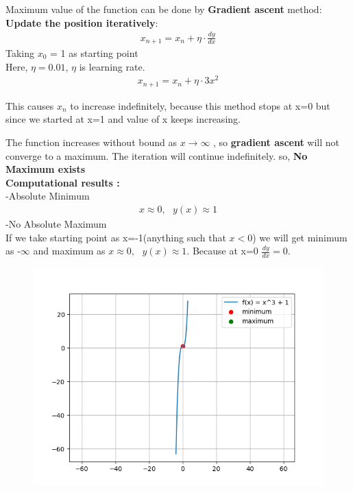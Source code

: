 \documentclass[journal]{IEEEtran}
\begin{document}
Maximum value of the function can be done by \textbf{Gradient ascent} method:\\
\textbf{Update the position iteratively}:
\begin{align}
    x_{n+1} = x_{n} + \eta \cdot \frac{dy}{dx}
\end{align}
Taking $x_0$ = 1 as starting point\\
 Here, $\eta = 0.01$, $\eta$ is learning rate.
\begin{align}
    x_{n+1} = x_{n} + \eta \cdot 3x^2
\end{align}

This causes $x_n$ to increase indefinitely, because this method stops at x=0 but since we started at x=1 and value of x keeps increasing.


The function increases without bound as $x \rightarrow \infty$ , so \textbf{gradient ascent} will not converge to a maximum. The iteration will continue indefinitely.
so, \textbf{No Maximum exists}\\

\textbf{Computational results :}\\
-Absolute Minimum
\begin{align}
    x \approx 0 , \text{ } y(x) \approx 1
\end{align}
-No Absolute Maximum\\

If we take starting point as x=-1(anything such that $x<0$) we will get minimum as -$\infty$ and maximum as $x \approx 0 , \text{ } y(x) \approx 1$. Because at x=0 $\frac{dy}{dx}=0.$

 \begin{figure}[ht!]
   \centering
   \includegraphics[width=\columnwidth]{figs/Figure_1.png}
\end{figure}
\end{document}
